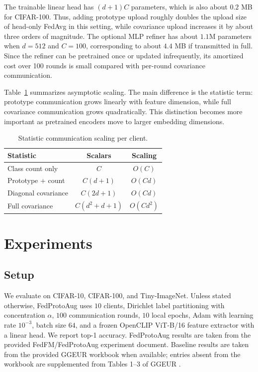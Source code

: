 ﻿\documentclass[runningheads]{llncs}
\newcommand{\method}{FedProtoAug}
\begin{document}
The trainable linear head has $(d+1)C$ parameters, which is also about $0.2$ MB for CIFAR-100. Thus, adding prototype upload roughly doubles the upload size of head-only FedAvg in this setting, while covariance upload increases it by about three orders of magnitude. The optional MLP refiner has about $1.1$M parameters when $d=512$ and $C=100$, corresponding to about $4.4$ MB if transmitted in full. Since the refiner can be pretrained once or updated infrequently, its amortized cost over 100 rounds is small compared with per-round covariance communication.

Table~\ref{tab:comm_scaling} summarizes asymptotic scaling. The main difference is the statistic term: prototype communication grows linearly with feature dimension, while full covariance communication grows quadratically. This distinction becomes more important as pretrained encoders move to larger embedding dimensions.

\begin{table}[t]
\centering
\caption{Statistic communication scaling per client.}
\label{tab:comm_scaling}
\begin{tabular}{lcc}
\toprule
Statistic & Scalars & Scaling \\
\midrule
Class count only & $C$ & $O(C)$ \\
Prototype + count & $C(d+1)$ & $O(Cd)$ \\
Diagonal covariance & $C(2d+1)$ & $O(Cd)$ \\
Full covariance & $C(d^2+d+1)$ & $O(Cd^2)$ \\
\bottomrule
\end{tabular}
\end{table}

\section{Experiments}

\subsection{Setup}
We evaluate on CIFAR-10, CIFAR-100, and Tiny-ImageNet. Unless stated otherwise, \method{} uses $10$ clients, Dirichlet label partitioning with concentration $\alpha$, $100$ communication rounds, $10$ local epochs, Adam with learning rate $10^{-3}$, batch size $64$, and a frozen OpenCLIP ViT-B/16 feature extractor \cite{ilharco2021openclip} with a linear head. We report top-1 accuracy. \method{} results are taken from the provided FedFM/FedProtoAug experiment document. Baseline results are taken from the provided GGEUR workbook when available; entries absent from the workbook are supplemented from Tables 1--3 of GGEUR \cite{ma2025ggeur}.
\end{document}
